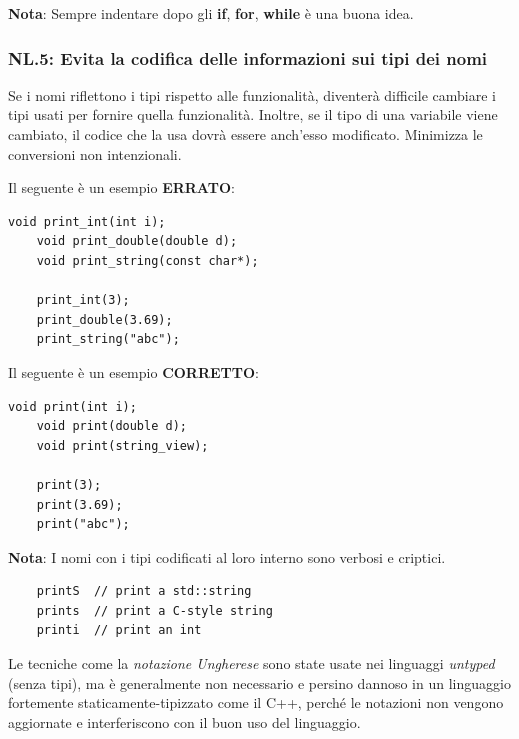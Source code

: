 \textsf{\small \textbf{Nota}: Sempre indentare dopo gli \textbf{if}, \textbf{for}, \textbf{while} è una buona idea.} \\

\subsubsection{NL.5: Evita la codifica delle informazioni sui tipi dei nomi} %

\textsf{\small Se i nomi riflettono i tipi rispetto alle funzionalità, diventerà difficile cambiare i tipi usati per fornire quella funzionalità. Inoltre, se il tipo di una variabile viene cambiato, il codice che la usa dovrà essere anch'esso modificato. Minimizza le conversioni non intenzionali.} \break

\textsf{\small Il seguente è un esempio \textbf{\color{red} ERRATO}\normalcolor:} \\


\begin{lstlisting}[frame=single, rulecolor=\color{red}]
	void print_int(int i);
	void print_double(double d);
	void print_string(const char*);
	
	print_int(3);
	print_double(3.69);
	print_string("abc");
\end{lstlisting}

\textsf{\small Il seguente è un esempio \textbf{\color{ForestGreen} CORRETTO}\normalcolor:} \\

\begin{lstlisting}[frame=single, rulecolor=\color{ForestGreen}]
	void print(int i);
	void print(double d);
	void print(string_view);
	
	print(3);
	print(3.69);
	print("abc");
\end{lstlisting}

\textsf{\small \textbf{Nota}: I nomi con i tipi codificati al loro interno sono verbosi e criptici.} \\

\begin{lstlisting}
	printS  // print a std::string
	prints  // print a C-style string
	printi  // print an int
\end{lstlisting}

\textsf{\small Le tecniche come la \emph{notazione Ungherese} sono state usate nei linguaggi \emph{untyped} (senza tipi), ma è generalmente non necessario e persino dannoso in un linguaggio fortemente staticamente-tipizzato come il C++, perché le notazioni non vengono aggiornate e interferiscono con il buon uso del linguaggio.} \\

